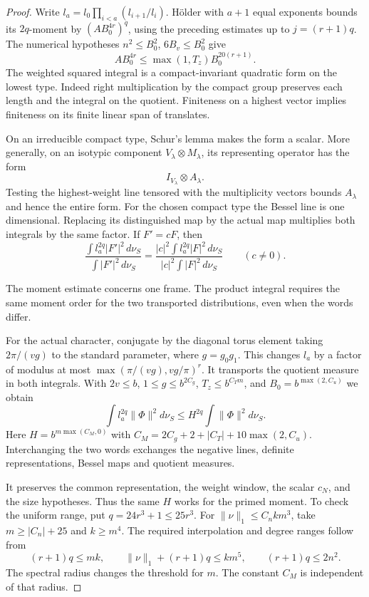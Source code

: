 \begin{proof}

Write \(l_a=l_0\prod_{i<a}(l_{i+1}/l_i)\). H\"older with
\(a+1\) equal exponents bounds its \(2q\)-moment by
\((A B_0^{4r})^q\), using the preceding estimates up to
\(j=(r+1)q\). The numerical hypotheses
\(n^2\le B_0^2\), \(6 B_v\le B_0^2\) give
\[
 A B_0^{4r}\le \max(1,T_z)B_0^{20(r+1)}.
\]
The weighted squared integral is a compact-invariant quadratic
form on the lowest type. Indeed right multiplication by the
compact group preserves each length and the integral on the
quotient. Finiteness on a highest vector implies finiteness on
its finite linear span of translates.

On an irreducible compact type, Schur's lemma makes the
form a scalar. More generally, on an isotypic component
\(V_\lambda\otimes M_\lambda\), its representing operator has the form
\[
     I_{V_\lambda}\otimes A_\lambda .
\]
Testing the highest-weight line tensored with the multiplicity
vectors bounds \(A_\lambda\) and hence the entire form. For the chosen compact type the
Bessel line is one dimensional. Replacing its distinguished map
by the actual map multiplies both integrals by the same factor. If \(F'=cF\), then
\[
  \frac{\int l_a^{2q}|F'|^2\,d\nu_S}{\int|F'|^2\,d\nu_S}
       =\frac{|c|^2\int l_a^{2q}|F|^2\,d\nu_S}{|c|^2\int|F|^2\,d\nu_S}
       \qquad(c\ne0).
\]


The moment estimate concerns one frame. The product integral requires the same moment order for the two transported distributions, even when the words differ.


For the actual character, conjugate by the diagonal torus
element taking \(2\pi/(vg)\) to the standard parameter, where
\(g=g_0g_1\). This changes \(l_a\) by a factor of modulus at
most \(\max(\pi/(vg),vg/\pi)^r\). It transports the quotient
measure in both integrals. With \(2v\le b\), \(1\le g\le
b^{2C_g}\), \(T_z\le b^{C_T m}\), and \(B_0=b^{\max(2,C_u)}\)
we obtain
\begin{equation}\label{eq:side-moment}
 \int l_a^{2q}\|\Phi\|^2d\nu_S
 \le H^{2q}\int\|\Phi\|^2d\nu_S.
\end{equation}
Here \(H=b^{m\max(C_M,0)}\) with
\(C_M=2C_g+2+|C_T|+10\max(2,C_u)\).
Interchanging the two words exchanges the negative lines,
definite representations, Bessel maps and quotient measures.

It preserves the common representation, the weight window, the
scalar \(c_N\), and the size hypotheses. Thus the same \(H\)
works for the primed moment. To check the uniform range, put
\(q=24r^3+1\le25r^3\). For
\(\|\nu\|_1\le C_nkm^3\), take \(m\ge |C_n|+25\)
and \(k\ge m^4\). The required interpolation and degree ranges follow from
\[
     (r+1)q\le mk,\qquad
     \|\nu\|_1+(r+1)q\le km^5,\qquad (r+1)q\le2n^2 .
\]
The spectral radius changes the threshold for \(m\).
The constant \(C_M\) is independent of that radius.

\end{proof}

